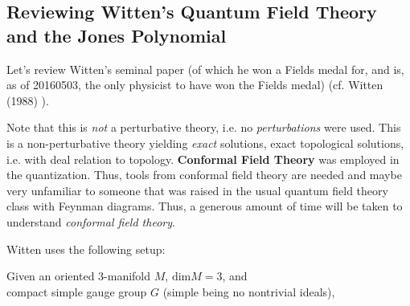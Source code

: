 \documentclass[10pt]{amsart}
\begin{document}

    







\subsection{Reviewing Witten's Quantum Field Theory and the Jones Polynomial}

Let's review Witten's seminal paper (of which he won a Fields medal for, and is, as of 20160503, the only physicist to have won the Fields medal) (cf. Witten (1988) \cite{Witten:1988hf}).  

Note that this is \emph{not} a perturbative theory, i.e. no \emph{perturbations} were used.  This is a non-perturbative theory yielding \emph{exact} solutions, exact topological solutions, i.e. with deal relation to topology.  \textbf{Conformal Field Theory} was employed in the quantization.  Thus, tools from conformal field theory are needed and maybe very unfamiliar to someone that was raised in the usual quantum field theory class with Feynman diagrams.  Thus, a generous amount of time will be taken to understand \emph{conformal field theory}.  

Witten uses the following setup:\cite{Witten:1988hf}

Given an oriented 3-manifold $M$, $\text{dim}M=3$, and \\
compact simple gauge group $G$ (simple being no nontrivial ideals),
\end{document}
